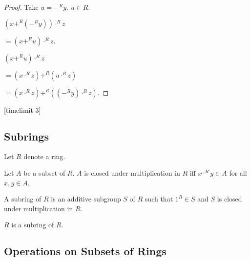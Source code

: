 \documentclass[english,11pt]{article}
\begin{document}
\begin{forthel}
\begin{proof} 
Take $u = -^{R} y$. $u \in R$.

$(x +^{R} (-^{R} y)) \cdot^{R} z $

$= (x +^{R} u) \cdot^{R} z $.

$(x +^{R} u) \cdot^{R} z $


$= (x \cdot^{R} z) +^{R} (u \cdot^{R} z)$


$= (x \cdot^{R} z) +^{R} ((-^{R} y) \cdot^{R} z)$.


\end{proof}
[timelimit 3]
\end{forthel}

\subsection{Subrings}
\begin{forthel}

Let $R$ denote a ring. 

\begin{definition} Let $A$ be a subset of $R$. $A$ is closed under
multiplication in $R$ iff $x \cdot^{R} y \in A$ for all $x,y \in A$.
\end{definition}


\begin{definition} A subring of $R$ is an additive subgroup $S$ of $R$ such that
$1^{R} \in S$ and $S$ is closed under multiplication in $R$.
\end{definition}

\begin{lemma} $R$ is a subring of $R$. \end{lemma}

\end{forthel}

\subsection{Operations on Subsets of Rings}
\renewcommand{\ast}{\cdot}
\renewcommand{\star}{\ }
\end{document}
